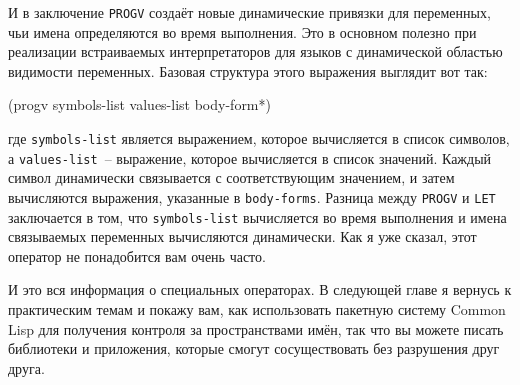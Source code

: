 И в заключение \lstinline{PROGV} создаёт новые динамические привязки для переменных, чьи имена
определяются во время выполнения.  Это в основном полезно при реализации встраиваемых
интерпретаторов для языков с динамической областью видимости переменных.  Базовая
структура этого выражения выглядит вот так:

\begin{myverb}
(progv symbols-list values-list
  body-form*)
\end{myverb}

\noindent{}где \lstinline{symbols-list} является выражением, которое вычисляется в список символов, а
\lstinline{values-list}~-- выражение, которое вычисляется в список значений.  Каждый символ
динамически связывается с соответствующим значением, и затем вычисляются выражения,
указанные в \lstinline{body-forms}.  Разница между \lstinline{PROGV} и \lstinline{LET} заключается в том,
что \lstinline{symbols-list} вычисляется во время выполнения и имена связываемых переменных
вычисляются динамически.  Как я уже сказал, этот оператор не понадобится вам очень часто.

И это вся информация о специальных операторах.  В следующей главе я вернусь к
практическим темам и покажу вам, как использовать пакетную систему Common Lisp для
получения контроля за пространствами имён, так что вы можете писать библиотеки и
приложения, которые смогут сосуществовать без разрушения друг друга.

